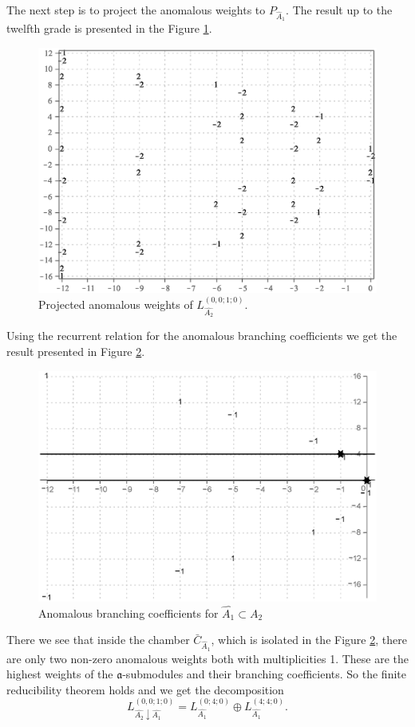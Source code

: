 \documentclass[12pt]{iopart}
\begin{document}
The next step is to project the anomalous weights to $P_{\hat A_1}$.
The result up to the twelfth grade is presented in the Figure \ref{fig:AffineA2_A1_anom_proj}.
\begin{figure}[h!tb]
  \centering
  \includegraphics[width=130mm]{figure8.eps}
  \caption{Projected anomalous weights of $L^{(0,0;1;0)}_{\hat{A_2}}$.}
  \label{fig:AffineA2_A1_anom_proj}
\end{figure}


Using the recurrent relation for the anomalous branching coefficients we get the result presented in Figure \ref{fig:AffineA2_A1_branching}. 
\begin{figure}[h!tb]
  \centering
  \includegraphics[width=130mm]{figure9.eps}
  \caption{Anomalous branching coefficients for $\hat{A_1}\subset \hat{A_2}$}
  \label{fig:AffineA2_A1_branching}
\end{figure}
There we see that inside the chamber $\bar{C}_{\hat{A}_1}$, which is isolated in the
Figure \ref{fig:AffineA2_A1_branching}, there are only two non-zero anomalous weights
both with multiplicities 1.
These are the highest weights of the $\mathfrak{a}$-submodules and their branching
coefficients. So the finite reducibility theorem holds and we get the decomposition
\begin{equation}
  \label{eq:43}
  L^{(0,0;1;0)}_{\hat{A_2}\downarrow \hat{A_1}}= L_{\hat{A_1}}^{(0;4;0)}\oplus L_{\hat{A_1}}^{(4;4;0)}.
\end{equation}
\end{document}
